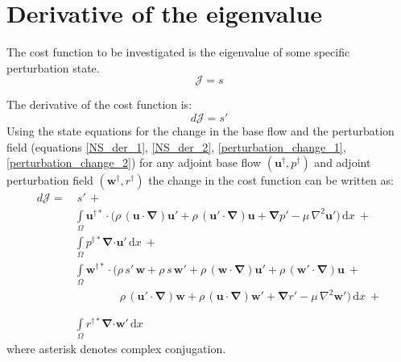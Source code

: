 \documentclass[12pt, a4paper]{article}
\begin{document}
\section{Derivative of the eigenvalue} \label{app:eigenvalue}
The cost function to be investigated is the eigenvalue of some specific perturbation state.
\begin{equation}
\mathcal{J} = s
\end{equation}

The derivative of the cost function is:
\begin{equation}
d \mathcal{J} = s'
\end{equation}
Using the state equations for the change in the base flow and the perturbation field (equations \ref{NS_der_1}, \ref{NS_der_2}, \ref{perturbation_change_1}, \ref{perturbation_change_2}) for any adjoint base flow $(\mathbf{u^{\dagger}},p^{\dagger})$ and adjoint perturbation field $(\mathbf{w^{\dagger}},r^{\dagger})$ the change in the cost function can be written as:
\begin{equation}
\begin{split}
d \mathcal{J} =& \ s' \, + \\
& \int\limits_{\Omega} \mathbf{u^{\dagger *} \cdot} \bigg( 
\rho \, (\mathbf{u \cdot} \boldsymbol{\nabla}) \mathbf{u'} + 
\rho \, (\mathbf{u' \cdot} \boldsymbol{\nabla}) \mathbf{u} + 
\boldsymbol{\nabla} p' - 
\mu \, \nabla^2 \mathbf{u'}
\bigg) \, \mathrm{d} x \ + \\
& \int\limits_{\Omega} p^{\dagger *} 
\boldsymbol{\nabla} \mathbf{\cdot u'}
\, \mathrm{d} x \ + \\
& \int\limits_{\Omega} \mathbf{w^{\dagger *} \cdot} \bigg( 
\rho \, s' \, \mathbf{w} + 
\rho \, s \, \mathbf{w'} + 
\rho \, (\mathbf{w \cdot} \boldsymbol{\nabla}) \mathbf{u'} + 
\rho \, (\mathbf{w' \cdot} \boldsymbol{\nabla}) \mathbf{u} \ + \\
&\phantom{\int\limits_{\Omega} \mathbf{w^{\dagger *} \cdot} \bigg( \ }
\rho \, (\mathbf{u' \cdot} \boldsymbol{\nabla}) \mathbf{w} + 
\rho \, (\mathbf{u \cdot} \boldsymbol{\nabla}) \mathbf{w'} +
\boldsymbol{\nabla} r' - 
\mu \, \nabla^2 \mathbf{w'}
\bigg) \, \mathrm{d} x \ + \\
& \int\limits_{\Omega} r^{\dagger *} 
\boldsymbol{\nabla} \mathbf{\cdot w'}
\, \mathrm{d} x
\end{split}
\end{equation}
where asterisk denotes complex conjugation.
\end{document}
